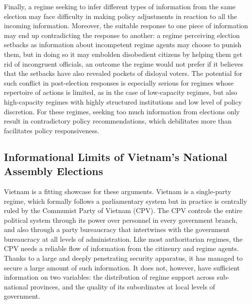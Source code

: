 \documentclass[12pt]{article}
\newcommand{\1}{\mathbbm{1}}
\begin{document}
Finally, a regime seeking to infer different types of information from the same election may face difficulty in making policy adjustments in reaction to all the incoming information. Moreover, the suitable response to one piece of information may end up contradicting the response to another: a regime perceiving election setbacks as information about incompetent regime agents may choose to punish them, but in doing so it may embolden disobedient citizens by helping them get rid of incongruent officials, an outcome the regime would not prefer if it believes that the setbacks have also revealed pockets of disloyal voters. The potential for such conflict in post-election responses is especially serious for regimes whose repertoire of actions is limited, as in the case of low-capacity regimes, but also high-capacity regimes with highly structured institutions and low level of policy discretion. For these regimes, seeking too much information from elections only result in contradictory policy recommendations, which debilitates more than facilitates policy responsiveness.

\subsection{Informational Limits of Vietnam's National Assembly Elections}
\label{sec:vietnam_limits}
Vietnam is a fitting showcase for these arguments. Vietnam is a single-party regime, which formally follows a parliamentary system but in practice is centrally ruled by the Communist Party of Vietnam (CPV). The CPV controls the entire political system through its power over personnel in every government branch, and also through a party bureaucracy that intertwines with the government bureaucracy at all levels of administration. Like most authoritarian regimes, the CPV needs a reliable flow of information from the citizenry and regime agents. Thanks to a large and deeply penetrating security apparatus, it has managed to secure a large amount of such information. It does not, however, have sufficient information on two variables: the distribution of regime support across sub-national provinces, and the quality of its subordinates at local levels of government. 
\end{document}
